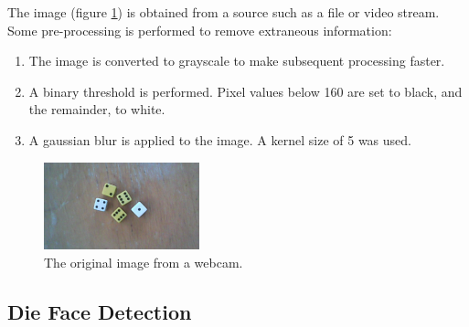 \documentclass[conference]{IEEEtran}
\begin{document}
The image (figure \ref{fig:original}) is obtained from a source such as a file or video stream.
Some pre-processing is performed to remove extraneous information:
\begin{enumerate}
	\item The image is converted to grayscale to make subsequent processing faster. 
	\item A binary threshold is performed. Pixel values below 160 are set to black, and the remainder, to white.
	\item A gaussian blur is applied to the image. A kernel size of 5 was used.
\end{enumerate}
\begin{figure}
	\centering
	\includegraphics[width=0.4\textwidth]{original}
	\caption{The original image from a webcam.}
	\label{fig:original}
\end{figure}

\subsection{Die Face Detection}
\end{document}
